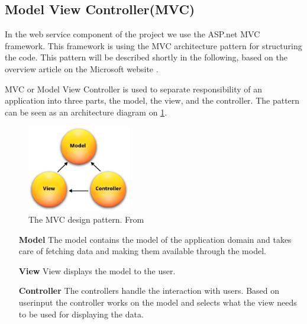 \subsection{Model View Controller(MVC)}
In the web service component of the project we use the ASP.net MVC framework. 
This framework is using the MVC architecture pattern for structuring the code.
This pattern will be described shortly in the following, based on the overview article on the Microsoft website \citet{aspmvc}.

MVC or Model View Controller is used to separate responsibility of an application into three parts, the model, the view, and the controller.
The pattern can be seen as an architecture diagram on \cref{mvcdiagram}.

\begin{figure}[h]
\center
\includegraphics[width=0.4\textwidth]{graphics/mvc}
\caption{The MVC design pattern. From \citet{aspmvc}}
\label{mvcdiagram}
\end{figure}

\begin{itemize}
\item[\textbf{Model}] The model contains the model of the application domain and takes care of fetching data and making them available through the model.
\item[\textbf{View}] View displays the model to the user.
\item[\textbf{Controller}] The controllers handle the interaction with users. Based on userinput the controller works on the model and selects what the view needs to be used for displaying the data.
\end{itemize}